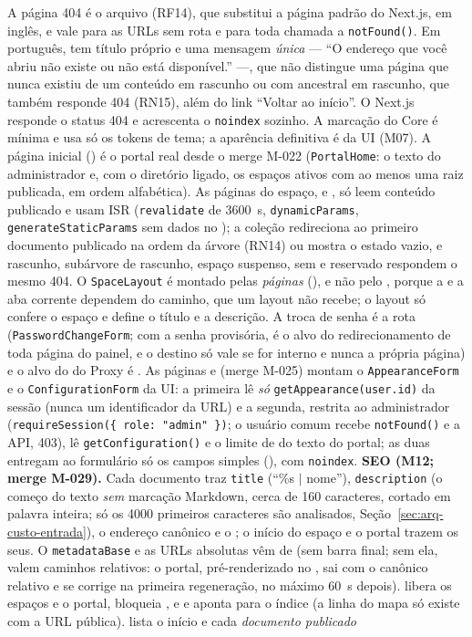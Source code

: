 A página 404 é o arquivo  (RF14), que substitui a página padrão do Next.js, em inglês, e vale para as URLs sem rota e para toda chamada a \texttt{notFound()}. Em português, tem título próprio e uma mensagem \emph{única} --- ``O endereço que você abriu não existe ou não está disponível.'' ---, que não distingue uma página que nunca existiu de um conteúdo em rascunho ou com ancestral em rascunho, que também responde 404 (RN15), além do link ``Voltar ao início''. O Next.js responde o status 404 e acrescenta o \texttt{noindex} sozinho. A marcação do Core é mínima e usa só os tokens de tema; a aparência definitiva é da UI (M07). A página inicial () é o portal real desde o merge M-022 (\texttt{PortalHome}: o texto do administrador e, com o diretório ligado, os espaços ativos com ao menos uma raiz publicada, em ordem alfabética). As páginas do espaço, \arq{/[handle]} e \arq{/[handle]/[...slug]}, só leem conteúdo publicado e usam ISR (\texttt{revalidate} de 3600~s, \texttt{dynamicParams}, \texttt{generateStaticParams} sem dados no ); a coleção redireciona ao primeiro documento publicado na ordem da árvore (RN14) ou mostra o estado vazio, e rascunho, subárvore de rascunho, espaço suspenso, sem  e  reservado respondem o mesmo 404. O \texttt{SpaceLayout} é montado pelas \emph{páginas} (), e não pelo , porque a  e a aba corrente dependem do caminho, que um layout não recebe; o layout só confere o espaço e define o título e a descrição. A troca de senha é a rota  (\texttt{PasswordChangeForm}; com a senha provisória, é o alvo do redirecionamento de toda página do painel, e o destino só vale se for interno e nunca a própria página) e o alvo do  do Proxy é . As páginas  e  (merge M-025) montam o \texttt{AppearanceForm} e o \texttt{ConfigurationForm} da UI: a primeira lê \emph{só} \texttt{getAppearance(user.id)} da sessão (nunca um identificador da URL) e a segunda, restrita ao administrador (\texttt{requireSession(\{ role: "admin" \})}; o usuário comum recebe \texttt{notFound()} e a API, 403), lê \texttt{getConfiguration()} e o limite de  do texto do portal; as duas entregam ao formulário só os campos simples (), com \texttt{noindex}. \textbf{SEO (M12; merge M-029).} Cada documento traz \texttt{title} (``\%s $|$ nome''), \texttt{description} (o começo do texto \emph{sem} marcação Markdown, cerca de 160 caracteres, cortado em palavra inteira; só os 4000 primeiros caracteres são analisados, Seção~\ref{sec:arq-custo-entrada}), o endereço canônico e o ; o início do espaço e o portal trazem os seus. O \texttt{metadataBase} e as URLs absolutas vêm de  (sem barra final; sem ela, valem caminhos relativos: o portal, pré-renderizado no , sai com o canônico relativo e se corrige na primeira regeneração, no máximo 60~s depois).  libera os espaços e o portal, bloqueia ,  e  e aponta para o índice (a linha do mapa só existe com a URL pública).  lista o início e cada \emph{documento publicado} 